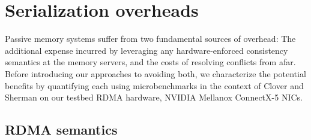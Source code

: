 \section{Serialization overheads}




Passive memory systems suffer from two fundamental sources of overhead: The
additional expense incurred by leveraging any hardware-enforced consistency
semantics at the memory servers, and the costs of resolving conflicts from afar.
Before introducing our approaches to avoiding both, we characterize the
potential benefits by quantifying each using microbenchmarks in the context of
Clover and Sherman on our testbed RDMA hardware, NVIDIA Mellanox ConnectX-5
NICs.





\subsection{RDMA semantics}

